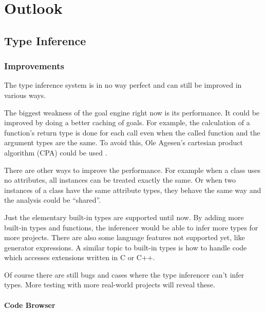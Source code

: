\documentclass[12pt,halfparskip,DIV11,BCOR10mm]{scrreprt}
\begin{document}
\chapter{Outlook}


\section{Type Inference}
\label{outlook_type_inference}

\subsection{Improvements}


The type inference system is in no way perfect and can still be improved in various ways.

The biggest weakness of the goal engine right now is its performance. It could be improved by doing a better caching of goals. For example, the calculation of a function's return type is done for each call even when the called function and the argument types are the same. To avoid this, Ole Agesen's cartesian product algorithm (CPA) could be used \cite{cpa}.

There are other ways to improve the performance. For example when a class uses no attributes, all instances can be treated exactly the same. Or when two instances of a class have the same attribute types, they behave the same way and the analysis could be ``shared''.

Just the elementary built-in types are supported until now. By adding more built-in types and functions, the inferencer would be able to infer more types for more projects. There are also some language features not supported yet, like generator expressions. A similar topic to built-in types is how to handle code which accesses extensions written in C or C++.

Of course there are still bugs and cases where the type inferencer can't infer types. More testing with more real-world projects will reveal these.

\subsubsection{Code Browser}
\end{document}
